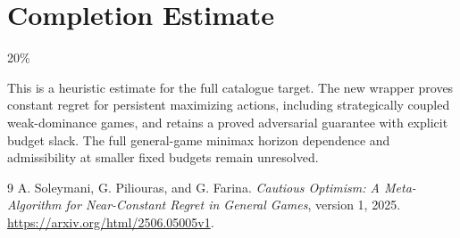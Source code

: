 \documentclass[11pt]{article}
\theoremstyle{definition}
\theoremstyle{remark}
\begin{document}
\section{Completion Estimate}
20\%

This is a heuristic estimate for the full catalogue target.
The new wrapper proves constant regret for persistent maximizing actions,
including strategically coupled weak-dominance games, and retains a proved
adversarial guarantee with explicit budget slack. The full general-game
minimax horizon dependence and admissibility at smaller fixed budgets remain
unresolved.

\begin{thebibliography}{9}
 A. Soleymani, G. Piliouras, and G. Farina.
\emph{Cautious Optimism: A Meta-Algorithm for Near-Constant Regret in General Games}, version 1, 2025.
\url{https://arxiv.org/html/2506.05005v1}.
\end{thebibliography}
\end{document}

